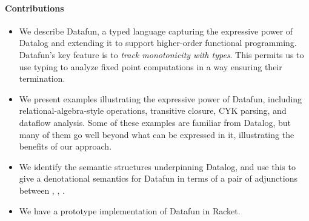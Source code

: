 \paragraph{Contributions}
\begin{itemize}
\item We describe Datafun, a typed language capturing the expressive power of
  Datalog and extending it to support higher-order functional programming.
  Datafun's key feature is to \emph{track monotonicity with types}. This permits
  us to use typing to analyze fixed point computations in a way ensuring their
  termination.

\item We present examples illustrating the expressive power of Datafun,
  including relational-algebra-style operations, transitive closure, CYK
  parsing, and dataflow analysis. Some of these examples are familiar from
  Datalog, but many of them go well beyond what can be expressed in it,
  illustrating the benefits of our approach.

\item We identify the semantic structures underpinning Datalog, and
  use this to give a denotational semantics for Datafun in terms of a
  pair of adjunctions between \cSet{}, \cPoset{}, \cSL{}.

\item We have a prototype implementation of Datafun in Racket. 
\end{itemize}







